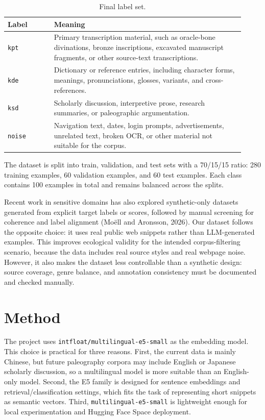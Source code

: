 \documentclass[11pt,a4paper]{article}
\begin{document}
\begin{table}[h]
\centering
\small
\begin{tabular}{p{0.18\linewidth}p{0.74\linewidth}}
\toprule
\textbf{Label} & \textbf{Meaning} \\
\midrule
\texttt{kpt} & Primary transcription material, such as oracle-bone divinations, bronze inscriptions, excavated manuscript fragments, or other source-text transcriptions. \\
\texttt{kde} & Dictionary or reference entries, including character forms, meanings, pronunciations, glosses, variants, and cross-references. \\
\texttt{ksd} & Scholarly discussion, interpretive prose, research summaries, or paleographic argumentation. \\
\texttt{noise} & Navigation text, dates, login prompts, advertisements, unrelated text, broken OCR, or other material not suitable for the corpus. \\
\bottomrule
\end{tabular}
\caption{Final label set.}
\label{tab:labels}
\end{table}

The dataset is split into train, validation, and test sets with a 70/15/15 ratio: 280 training examples, 60 validation examples, and 60 test examples. Each class contains 100 examples in total and remains balanced across the splits.

Recent work in sensitive domains has also explored synthetic-only datasets generated from explicit target labels or scores, followed by manual screening for coherence and label alignment (Moëll and Aronsson, 2026). Our dataset follows the opposite choice: it uses real public web snippets rather than LLM-generated examples. This improves ecological validity for the intended corpus-filtering scenario, because the data includes real source styles and real webpage noise. However, it also makes the dataset less controllable than a synthetic design: source coverage, genre balance, and annotation consistency must be documented and checked manually.

\section{Method}

The project uses \texttt{intfloat/multilingual-e5-small} as the embedding model. This choice is practical for three reasons. First, the current data is mainly Chinese, but future paleography corpora may include English or Japanese scholarly discussion, so a multilingual model is more suitable than an English-only model. Second, the E5 family is designed for sentence embeddings and retrieval/classification settings, which fits the task of representing short snippets as semantic vectors. Third, \texttt{multilingual-e5-small} is lightweight enough for local experimentation and Hugging Face Space deployment.
\end{document}
